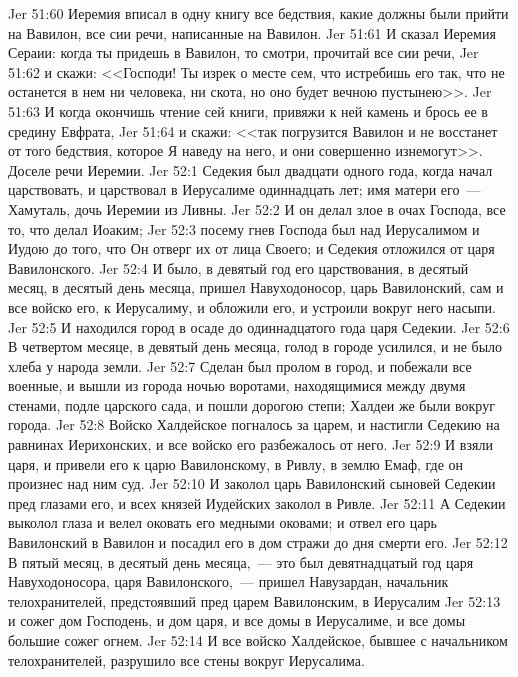 \vs Jer 51:60 Иеремия вписал в одну книгу все бедствия, какие должны были прийти на Вавилон, все сии речи, написанные на Вавилон.
\vs Jer 51:61 И сказал Иеремия Сераии: когда ты придешь в Вавилон, то смотри, прочитай все сии речи,
\vs Jer 51:62 и скажи: <<Господи! Ты изрек о месте сем, что истребишь его так, что не останется в нем ни человека, ни скота, но оно будет вечною пустынею>>.
\vs Jer 51:63 И когда окончишь чтение сей книги, привяжи к ней камень и брось ее в средину Евфрата,
\vs Jer 51:64 и скажи: <<так погрузится Вавилон и не восстанет от того бедствия, которое Я наведу на него, и они совершенно изнемогут>>. Доселе речи Иеремии.
\vs Jer 52:1 Седекия был двадцати одного года, когда начал царствовать, и царствовал в Иерусалиме одиннадцать лет; имя матери его~--- Хамуталь, дочь Иеремии из Ливны.
\vs Jer 52:2 И он делал злое в очах Господа, все то, что делал Иоаким;
\vs Jer 52:3 посему гнев Господа был над Иерусалимом и Иудою до того, что Он отверг их от лица Своего; и Седекия отложился от царя Вавилонского.
\vs Jer 52:4 И было, в девятый год его царствования, в десятый месяц, в десятый день месяца, пришел Навуходоносор, царь Вавилонский, сам и все войско его, к Иерусалиму, и обложили его, и устроили вокруг него насыпи.
\vs Jer 52:5 И находился город в осаде до одиннадцатого года царя Седекии.
\vs Jer 52:6 В четвертом месяце, в девятый день месяца, голод в городе усилился, и не было хлеба у народа земли.
\vs Jer 52:7 Сделан был пролом в город, и побежали все военные, и вышли из города ночью воротами, находящимися между двумя стенами, подле царского сада, и пошли дорогою степи; Халдеи же были вокруг города.
\vs Jer 52:8 Войско Халдейское погналось за царем, и настигли Седекию на равнинах Иерихонских, и все войско его разбежалось от него.
\vs Jer 52:9 И взяли царя, и привели его к царю Вавилонскому, в Ривлу, в землю Емаф, где он произнес над ним суд.
\vs Jer 52:10 И заколол царь Вавилонский сыновей Седекии пред глазами его, и всех князей Иудейских заколол в Ривле.
\vs Jer 52:11 А Седекии выколол глаза и велел оковать его медными оковами; и отвел его царь Вавилонский в Вавилон и посадил его в дом стражи до дня смерти его.
\rsbpar\vs Jer 52:12 В пятый месяц, в десятый день месяца,~--- это был девятнадцатый год царя Навуходоносора, царя Вавилонского,~--- пришел Навузардан, начальник телохранителей, предстоявший пред царем Вавилонским, в Иерусалим
\vs Jer 52:13 и сожег дом Господень, и дом царя, и все домы в Иерусалиме, и все домы большие сожег огнем.
\vs Jer 52:14 И все войско Халдейское, бывшее с начальником телохранителей, разрушило все стены вокруг Иерусалима.
